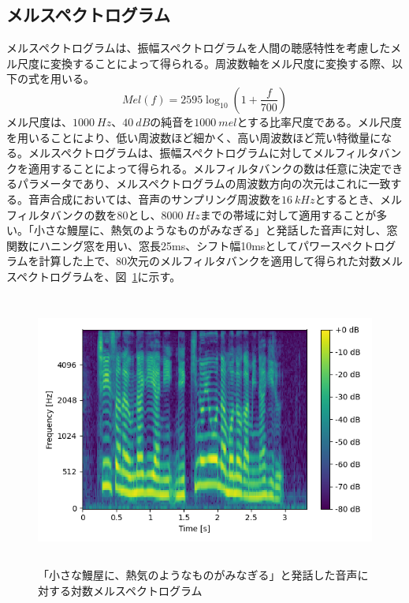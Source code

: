 \documentclass[12pt]{jarticle}
\numberwithin{equation}{section}    %
\numberwithin{figure}{section}      %
\numberwithin{table}{section}      %
\begin{document}
\subsection{メルスペクトログラム}
メルスペクトログラムは、振幅スペクトログラムを人間の聴感特性を考慮したメル尺度に変換することによって得られる。周波数軸をメル尺度に変換する際、以下の式を用いる。
\begin{equation}
    Mel(f) = 2595\log_{10} \left(1 + \frac{f}{700}\right)
\end{equation}
メル尺度は、$\SI[]{1000}{Hz}$、$\SI[]{40}{dB}$の純音を$\SI[]{1000}{mel}$とする比率尺度である。メル尺度を用いることにより、低い周波数ほど細かく、高い周波数ほど荒い特徴量になる。メルスペクトログラムは、振幅スペクトログラムに対してメルフィルタバンクを適用することによって得られる。メルフィルタバンクの数は任意に決定できるパラメータであり、メルスペクトログラムの周波数方向の次元はこれに一致する。音声合成においては、音声のサンプリング周波数を$\SI[]{16}{kHz}$とするとき、メルフィルタバンクの数を80とし、$\SI[]{8000}{Hz}$までの帯域に対して適用することが多い。「小さな鰻屋に、熱気のようなものがみなぎる」と発話した音声に対し、窓関数にハニング窓を用い、窓長25ms、シフト幅10msとしてパワースペクトログラムを計算した上で、80次元のメルフィルタバンクを適用して得られた対数メルスペクトログラムを、図~\ref{sec2:fig:melspectrogram}に示す。
\begin{figure}[bt]
    \centering
    \includegraphics[height=90mm]{./figure/sec2/melspectrogram.png}
    \caption{「小さな鰻屋に、熱気のようなものがみなぎる」と発話した音声に対する対数メルスペクトログラム}
    \label{sec2:fig:melspectrogram}
\end{figure}

\clearpage
\end{document}
